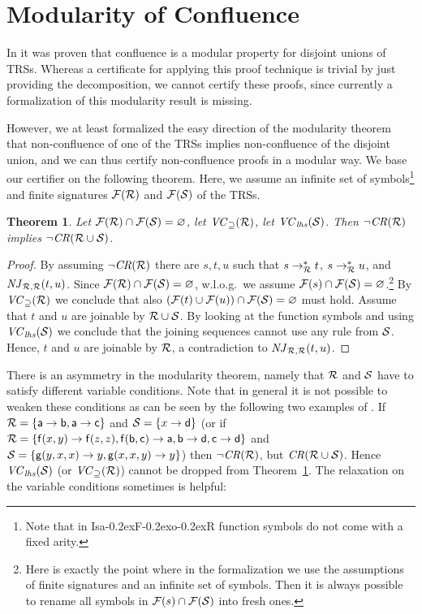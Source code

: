 \documentclass[a4paper]{easychair}
\newtheorem{theorem}{Theorem}
\newcommand\isafor{\textsf{Isa\kern-0.2exF\kern-0.2exo\kern-0.2exR}\xspace}
\newcommand\FF{{\cal F}}
\newcommand\RR{{\cal R}}
\newcommand\SSS{{\cal S}}
\newcommand\CR{\mathit{CR}}
\newcommand\nCR{\neg \CR}
\newcommand\njin[3]{\mathit{NJ}_{#1}(#2,#3)}
\newcommand\njo[3]{\njin{#1,#1}{#2}{#3}}
\newcommand\m[1]{\mathsf{#1}}
\newcommand\rTH[1]{Theorem~\ref{#1}}
\newcommand{\vclhs}[1]{\mathit{VC}_{\mathit{lhs}}(#1)}
\newcommand{\vcsubset}[1]{\mathit{VC}_{\supseteq}(#1)}
\begin{document}
\section{Modularity of Confluence}

In \cite{Toyama87} it was proven that confluence is a modular property
for disjoint unions of TRSs. Whereas a certificate for applying this proof technique
is trivial by just providing the decomposition, we cannot certify these proofs, since
currently a formalization of this modularity result is missing.

However, we at least formalized the easy direction of the modularity theorem that
non-confluence of one of the TRSs implies non-confluence of the disjoint union,
and we can thus certify non-confluence proofs in a modular way. We base our 
certifier on the following theorem.
Here, we assume an infinite set of symbols\footnote{Note that in \isafor function symbols do not come with a fixed arity.} 
and finite signatures $\FF(\RR)$ and $\FF(\SSS)$ of the TRSs. 


\begin{theorem}
\label{mod}
Let $\FF(\RR) \cap \FF(\SSS) = \varnothing$, let $\vcsubset\RR$, let $\vclhs\SSS$.
Then $\nCR(\RR)$ implies $\nCR(\RR \cup \SSS)$.
\end{theorem}

\begin{proof}
By assuming $\nCR(\RR)$ there are $s,t,u$ such that $s \to_\RR^* t$, $s \to_\RR^* u$,
and $\njo\RR tu$. Since $\FF(\RR) \cap \FF(\SSS) = \varnothing$, w.l.o.g.\ we assume 
$\FF(s) \cap \FF(\SSS) = \varnothing$.\footnote{Here is exactly the
point where in the formalization we use the assumptions of finite signatures and an infinite
set of symbols. Then it is always possible to rename all symbols in $\FF(s) \cap \FF(\SSS)$
into fresh ones.} By $\vcsubset\RR$ we conclude that also $(\FF(t) \cup \FF(u))
\cap \FF(\SSS) = \varnothing$ must hold. Assume that $t$ and $u$ are joinable by
$\RR \cup \SSS$. By looking at the function symbols and using $\vclhs\SSS$ we conclude
that the joining sequences cannot use any rule from $\SSS$. Hence, $t$ and $u$ are 
joinable by $\RR$, a contradiction to $\njo\RR tu$. 
\end{proof}

There is an asymmetry in the modularity theorem, namely that $\RR$ and $\SSS$
have to satisfy different variable conditions. Note that in general it is not possible
to weaken these conditions as can be seen by the following two examples of \cite[Example 20 and 
example in Section 5.3]{IJCAR}. 
If $\RR = \{\m a \to \m b, \m a \to \m c\}$ and $\SSS = \{x \to \m d\}$ 
(or if $\RR = \{\m f(x,y) \to \m f(z,z), \m f(\m b, \m c) \to \m a, \m b \to \m d, \m c \to \m d\}$
and $\SSS = \{\m g(y,x,x) \to y, \m g(x,x,y) \to y\}$) then $\nCR(\RR)$, but $\CR(\RR \cup \SSS)$.
Hence $\vclhs\SSS$ (or $\vcsubset\RR$) cannot be dropped from \rTH{mod}.
The relaxation on the variable conditions sometimes is helpful:
\end{document}

